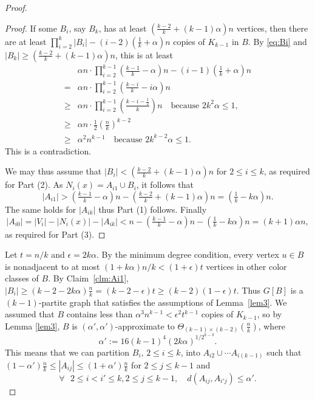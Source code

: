 \documentclass[reqno]{amsart}
\theoremstyle{plain}
\def\a{\alpha}
\def\eps{\epsilon}
\begin{document}
\begin{proof}
\begin{proof}
If some $B_i$, say $B_k$, has at least $(\tfrac{k-2}k+(k-1)\alpha)n$ vertices, then there are at least
$ \prod_{i=2}^k |B_i| - (i-2) \left(\frac{1}{k} + \alpha \right) n$ copies of $K_{k-1}$ in $B$.
By \eqref{eq:Bi} and $|B_k|\ge (\tfrac{k-2}k+(k-1)\alpha)n$, this is at least
\begin{align*}
 & \a n \cdot \prod_{i=2}^{k-1} \left( \frac{k-1}{k} - \a \right) n - (i-1) \left(\frac{1}{k} + \alpha \right) n \\
= & \a n \cdot \prod_{i=2}^{k-1} \left( \frac{k-i}{k} -  i\a \right) n \\
\ge & \a n \cdot \prod_{i=2}^{k-1} \left( \frac{k-i - \tfrac12}{k} \right) n \quad \text{because } 2k^2 \a \le 1, \\
\ge &  \a n \cdot \frac12 \left(\frac{n}{k} \right)^{k-2} \\
\ge & \a^2 n^{k-1} \quad \text{because } 2k^{k-2} \a \le 1.
\end{align*}
This is a contradiction.

We may thus assume that $|B_i|<(\tfrac{k-2}k+(k-1)\alpha)n$ for $2\le i \le k$, as required for Part (2). As $N_i(x)=A_{i1}\cup B_i$, it follows that
$$
|A_{i1}|> (\tfrac{k-1}k-\alpha)n-(\tfrac{k-2}k+(k-1)\alpha)n=(\tfrac1k-k\alpha)n.
$$
The same holds for $|A_{ik}|$ thus Part (1) follows. Finally
\[
|A_{i0}| = |V_i| - |N_i(x)| - |A_{ik}| < n-(\tfrac{k-1}k-\alpha)n-(\tfrac1k-k\alpha)n = (k+1)\alpha n,
\]
as required for Part (3).
\end{proof}

Let $t= n/k$ and $\epsilon=2k\alpha$. By the minimum degree condition, every vertex $u\in B$ is nonadjacent to at most $(1+ k\alpha) n/k <(1+\epsilon)t$ vertices in other color classes of $B$. By Claim~\ref{clm:Ai1}, $|B_i|\ge (k-2 - 2k\alpha)\frac{n}{k} =(k-2-\epsilon)t\ge (k-2)(1-\epsilon)t$.  Thus $G[B]$ is a $(k-1)$-partite graph that
satisfies the assumptions of Lemma~\ref{lem3}. We assumed that $B$ contains less than $\alpha^3 n^{k-1}<\eps^2 t^{k-1}$ copies of $K_{k-1}$, so by Lemma \ref{lem3}, $B$ is $(\a', \a')$-approximate to $\Theta_{(k-1)\times(k-2)}(\tfrac nk)$, where
\[
\alpha':=16(k-1)^4 (2k\alpha)^{1/2^{k-3}}.
\]
This means that we can partition $B_i$, $2\le i \le k$, into $A_{i2} \cup \cdots A_{i(k-1)}$ such that $(1- \alpha')\tfrac nk \le |A_{ij}| \le (1+ \alpha') \tfrac nk$ for $2\le j\le k-1$ and
\begin{equation}\label{eq:2den middle}
    \forall \text{ } 2\le i < i'\le k, 2\le j\le k-1, \quad d(A_{ij}, A_{i'j})\le \alpha'.
\end{equation}


\end{proof}
\end{document}
